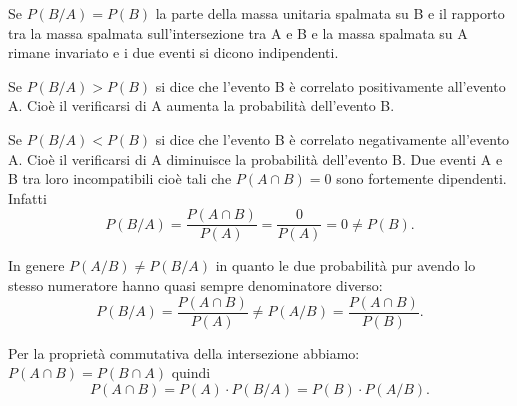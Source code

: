 Se $P(B/A)=P(B)$ la parte della massa unitaria spalmata su B e il rapporto tra 
la massa spalmata sull'intersezione tra A e B e la massa spalmata su A rimane 
invariato e i due eventi si dicono indipendenti.

Se $P(B/A)>P(B)$ si dice che l'evento B è correlato positivamente all'evento A. 
Cioè il verificarsi di A aumenta la probabilità dell'evento B.

Se $P(B/A)<P(B)$ si dice che l'evento B è correlato negativamente all'evento A. 
Cioè il verificarsi di A diminuisce la probabilità dell'evento B.
\osservazione Due eventi A e B tra loro incompatibili cioè tali che $P(A\cap 
B)=0$ sono fortemente dipendenti. Infatti 
\[P(B/A)=\frac{P(A\cap B)}{P(A)}=\frac 0{P(A)}=0\neq P(B).\]

In genere $ P(A/B)\neq P(B/A) $ in quanto le due probabilità pur avendo lo 
stesso numeratore hanno quasi sempre denominatore diverso: 
\[P(B/A)=\frac{P(A\cap B)}{P(A)}\neq P(A/B)=\frac{P(A\cap B)}{P(B)}.\]

Per la proprietà commutativa della intersezione abbiamo: $P(A\cap B)=P(B\cap A)$ 
quindi 
\[P(A\cap B)=P(A)\cdot P(B/A)=P(B)\cdot P(A/B).\]

